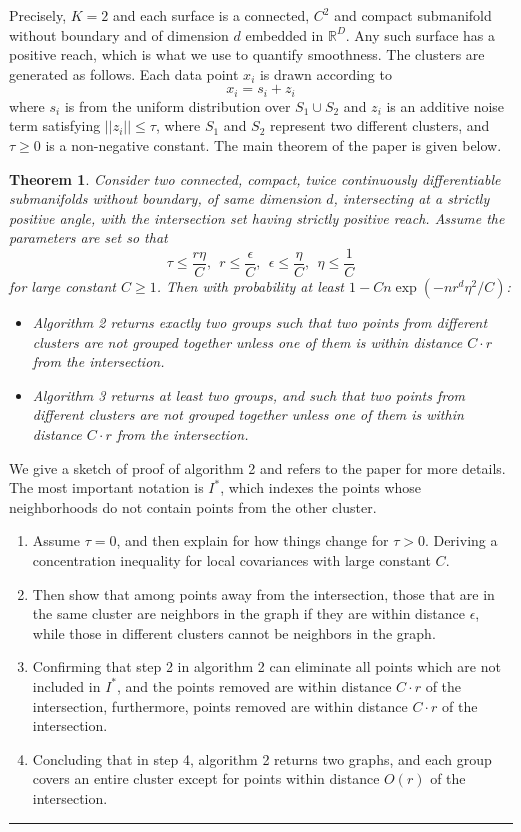 \documentclass{article}
\newcommand{\BlackBox}{\rule{1.5ex}{1.5ex}}  %
\newenvironment{proof}{\par\noindent{\bf Proof\ }}{\hfill\BlackBox\\[2mm]}
\newtheorem{theorem}{Theorem}
\begin{document}
Precisely, $K=2$ and each surface is a connected, $C^2$ and compact submanifold without boundary and of dimension $d$ embedded in $\mathbb R^D$.
Any such surface has a positive reach, which is what we use to quantify smoothness.
The clusters are generated as follows.
Each data point $x_i$ is drawn according to
$$ x_i = s_i + z_i $$
where $s_i$ is from the uniform distribution over
$S_1\cup S_2$ and $z_i$
is an additive noise term satisfying $||z_i||\le \tau$, where \(S_1\) and \(S_2\) represent two different clusters, and \(\tau\geq0\) is a non-negative constant.
The main theorem of the paper is given below.
\begin{theorem}
Consider two connected, compact, twice continuously differentiable submanifolds
without boundary, of same dimension \(d\), intersecting at a strictly positive angle, with the intersection set having strictly positive reach.
Assume the parameters are set so that
$$
\tau\le \frac{r\eta}{C},\ \ r\le\frac{\epsilon}{C},\ \ \epsilon\le\frac{\eta}{C},\ \ \eta\le\frac{1}{C}
$$
for large constant $C\ge 1$.
Then with probability at least $1-Cn\exp(- nr^d\eta^2/C)$:
\begin{itemize}
\item Algorithm 2 returns exactly two groups such that two points from different clusters are not grouped together unless one of them is within distance \(C\cdot r\) from the intersection.
\item Algorithm 3 returns at least two groups, and such that two points from different clusters are not grouped together unless one of them is within distance \(C\cdot r\) from the intersection.
\end{itemize}
\end{theorem}

\begin{proof}
We give a sketch of proof of algorithm 2 and refers to the paper for more details.
The most important notation is $I^*$, which indexes the points whose neighborhoods do not contain points from the other cluster.

\begin{enumerate}
\item Assume $\tau=0$, and then explain for how things change for $\tau>0$. Deriving a concentration inequality for local covariances with large constant $C$.
\item Then show that among points away from the intersection, those that are in the same cluster are neighbors in the graph if they are within distance $\epsilon$, while those in different clusters cannot be neighbors in the graph.
\item Confirming that step 2 in algorithm 2 can eliminate all points which are not included in $I^*$, and  the points removed are within distance \(C\cdot r\) of the intersection, furthermore,  points removed are within distance \(C\cdot r\) of the intersection.
\item Concluding that in step 4, algorithm 2 returns two graphs, and each group covers an entire cluster except for points within distance $O(r)$ of the intersection.
\end{enumerate}
\end{proof}
\end{document}

